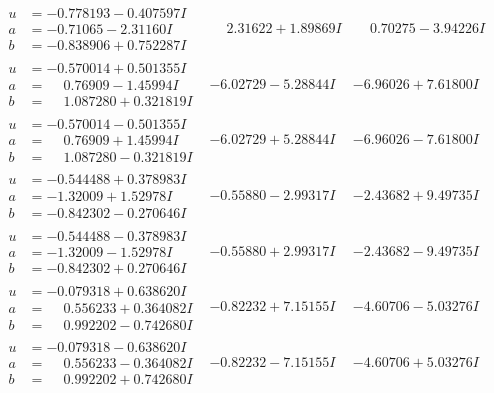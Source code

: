 \documentclass[1p]{elsarticle_modified}
\theoremstyle{definition}
\begin{document}
$$\begin{array}{c|c|c}
\begin{aligned}
u &= -0.778193 - 0.407597 I \\
a &= -0.71065 - 2.31160 I \\
b &= -0.838906 + 0.752287 I\end{aligned}
 & \phantom{-}2.31622 + 1.89869 I & \phantom{-}0.70275 - 3.94226 I \\ \hline\begin{aligned}
u &= -0.570014 + 0.501355 I \\
a &= \phantom{-}0.76909 - 1.45994 I \\
b &= \phantom{-}1.087280 + 0.321819 I\end{aligned}
 & -6.02729 - 5.28844 I & -6.96026 + 7.61800 I \\ \hline\begin{aligned}
u &= -0.570014 - 0.501355 I \\
a &= \phantom{-}0.76909 + 1.45994 I \\
b &= \phantom{-}1.087280 - 0.321819 I\end{aligned}
 & -6.02729 + 5.28844 I & -6.96026 - 7.61800 I \\ \hline\begin{aligned}
u &= -0.544488 + 0.378983 I \\
a &= -1.32009 + 1.52978 I \\
b &= -0.842302 - 0.270646 I\end{aligned}
 & -0.55880 - 2.99317 I & -2.43682 + 9.49735 I \\ \hline\begin{aligned}
u &= -0.544488 - 0.378983 I \\
a &= -1.32009 - 1.52978 I \\
b &= -0.842302 + 0.270646 I\end{aligned}
 & -0.55880 + 2.99317 I & -2.43682 - 9.49735 I \\ \hline\begin{aligned}
u &= -0.079318 + 0.638620 I \\
a &= \phantom{-}0.556233 + 0.364082 I \\
b &= \phantom{-}0.992202 - 0.742680 I\end{aligned}
 & -0.82232 + 7.15155 I & -4.60706 - 5.03276 I \\ \hline\begin{aligned}
u &= -0.079318 - 0.638620 I \\
a &= \phantom{-}0.556233 - 0.364082 I \\
b &= \phantom{-}0.992202 + 0.742680 I\end{aligned}
 & -0.82232 - 7.15155 I & -4.60706 + 5.03276 I \\ \hline\begin{aligned}

\end{aligned}
\end{array}$$
\end{document}
